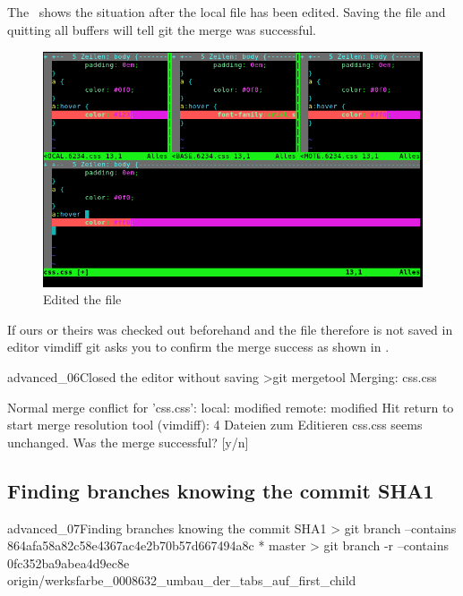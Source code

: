 The~ shows the situation after the local file has been edited. Saving the file and quitting all buffers will tell git the merge was successful.
\label{fig:diff_view01}
\begin{figure}[htbp]
  \centering
  \includegraphics[width=\textwidth]{vimdiff_mergetool_01.png}
  \caption{Edited the file}
\end{figure}

If ours or theirs was checked out beforehand and the file therefore is not saved in editor vimdiff git asks you to confirm the merge success as shown in .
\begin{codelisting}{advanced_06}{Closed the editor without saving}
>git mergetool
Merging:
css.css

Normal merge conflict for 'css.css':
  {local}: modified
  {remote}: modified
Hit return to start merge resolution tool (vimdiff): 
4 Dateien zum Editieren
css.css seems unchanged.
Was the merge successful? [y/n]
\end{codelisting}
\subsection{Finding branches knowing the commit SHA1}
\begin{codelisting}{advanced_07}{Finding branches knowing the commit SHA1}
> git branch --contains 864afa58a82c58e4367ac4e2b70b57d667494a8c
* master
> git branch -r --contains 0fc352ba9abea4d9ec8e
  origin/werksfarbe_0008632_umbau_der_tabs_auf_first_child
\end{codelisting}
